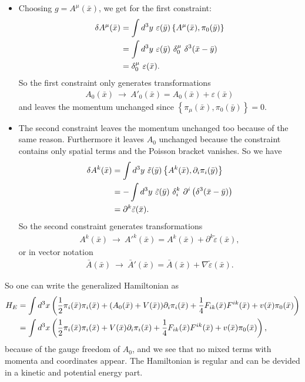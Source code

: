 \begin{itemize}
\item Choosing $g = A^{\mu}(\bar{x})$, we get for the first constraint:
\begin{align}
\delta A^{\mu}(\bar{x}) &= \int d^3 y \ \varepsilon(\bar{y}) \left\{ A^{\mu}(\bar{x}), \pi_0(\bar{y}) \right\} \notag \\
&= \int d^3 y \ \varepsilon(\bar{y}) \ \delta_0^{\mu} \ \delta^3(\bar{x} - \bar{y}) \notag \\
&= \delta_0^{\mu} \ \varepsilon(\bar{x}).
\end{align}
So the first constraint only generates transformations 
\begin{align}
A_0(\bar{x}) \ \longrightarrow \ A'_0(\bar{x}) = A_0(\bar{x}) + \varepsilon(\bar{x})
\end{align}
and leaves the momentum unchanged since $\left\{ \pi_{\mu}(\bar{x}), \pi_0(\bar{y}) \right\} = 0$.
\item The second constraint leaves the momentum unchanged too because of the same reason. Furthermore it leaves $A_0$ unchanged because the constraint contains only spatial terms and the Poisson bracket vanishes. So we have
\begin{align}
\delta A^k(\bar{x}) &= \int d^3 y \ \tilde{\varepsilon}(\bar{y}) \left\{ A^k(\bar{x}), \partial_i \pi_i(\bar{y}) \right\} \notag \\
&= - \int d^3 y \ \tilde{\varepsilon}(\bar{y}) \ \delta_i^k \ \partial^i \left( \delta^3(\bar{x} - \bar{y}) \right) \notag \\
&= \partial^k \tilde{\varepsilon}(\bar{x}).
\end{align}
So the second constraint generates transformations 
\begin{align}
A^k(\bar{x}) \ \longrightarrow \ A'^k(\bar{x}) = A^k(\bar{x}) + \partial^k \tilde{\varepsilon}(\bar{x}),
\end{align}
or in vector notation
\begin{align}
\bar{A}(\bar{x}) \ \longrightarrow \ \bar{A}'(\bar{x}) = \bar{A}(\bar{x}) + \nabla \tilde{\varepsilon}(\bar{x}).
\end{align}
\end{itemize}

So one can write the generalized Hamiltonian as
\begin{align}
H_E &= \int d^3 x \left( \frac{1}{2} \pi_i(\bar{x})\pi_i(\bar{x}) + (A_0(\bar{x}) + V(\bar{x})) \partial_i \pi_i(\bar{x}) + \frac{1}{4} F_{i k}(\bar{x}) F^{i k}(\bar{x}) + v(\bar{x}) \pi_0(\bar{x}) \right) \notag \\
&= \int d^3 x \left( \frac{1}{2} \pi_i(\bar{x})\pi_i(\bar{x}) + V(\bar{x}) \partial_i \pi_i(\bar{x}) + \frac{1}{4} F_{i k}(\bar{x}) F^{i k}(\bar{x}) + v(\bar{x}) \pi_0(\bar{x}) \right),
\end{align}
because of the gauge freedom of $A_0$, and we see that no mixed terms with momenta and coordinates appear. The Hamiltonian is regular and can be devided in a kinetic and potential energy part. \\

